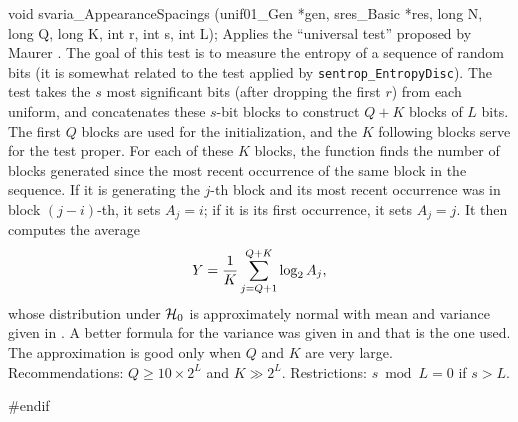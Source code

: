 void svaria_AppearanceSpacings (unif01_Gen *gen, sres_Basic *res,
                               long N, long Q, long K, int r, int s, int L);
\endcode
 \tab Applies the ``universal test'' proposed by Maurer \cite{rMAU92a}.
   The goal of this test is to measure the entropy of a sequence
   of
   random  bits (it is somewhat related to the test applied by
   {\tt sentrop\_EntropyDisc}).
   The test takes the $s$ most significant bits (after dropping the first
   $r$) from each uniform, and concatenates these $s$-bit blocks to
   construct $Q + K$ blocks of $L$ bits.
   The first $Q$ blocks are used for the initialization, and
   the $K$ following blocks serve for the test proper.
   For each of these $K$ blocks, the function finds the number of blocks
   generated since the most recent occurrence of the same block in the
   sequence. If it is generating the $j$-th block and its most recent
   occurrence was in block $(j-i)$-th, it sets $A_j = i$;
   if it is its first occurrence, it sets $A_j = j$.
   It then computes the average
      $$ Y = {1\over K} \sum_{j=Q+1}^{Q+K} \log_2 A_j, $$
   whose distribution under $\mathcal{H}_0$ is approximately normal with
   mean and variance given in \cite{rMAU92a}. A better formula for the
   variance was given in \cite{rCOR99a} and that is the one used.
   The approximation is good only when $Q$ and $K$ are very large.
   Recommendations: $Q\ge 10 \times 2^{L}$ and $K \gg 2^{L}$.
   Restrictions: $s \bmod L = 0$ if $s > L$.
 \endtab

\code
\hide
#endif
\endhide
\endcode

